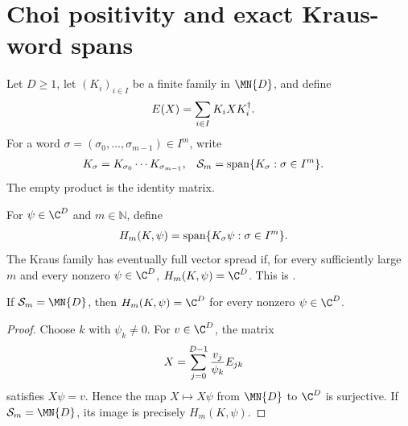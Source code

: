 \section{Choi positivity and exact Kraus-word spans}
\label{sec:kraus_iterate_choi}

Let $D\geq1$, let $(K_i)_{i\in I}$ be a finite family in $\MN{D}$, and define
\begin{align}
    E(X)&=\sum_{i\in I}K_iXK_i^\dagger.
    \notag
\end{align}
For a word $\sigma=(\sigma_0,\ldots,\sigma_{m-1})\in I^m$, write
\begin{align}
    K_\sigma&=K_{\sigma_0}\cdots K_{\sigma_{m-1}},
    &
    \mathcal S_m&=\operatorname{span}\{K_\sigma:\sigma\in I^m\}.
    \notag
\end{align}
The empty product is the identity matrix.

\begin{definition}
    \label{def:kraus_eventually_full_vector_spread}
    \leanok
    For $\psi\in\C^D$ and $m\in\mathbb N$, define
    \begin{align}
        H_m(K,\psi)
        &=\operatorname{span}\{K_\sigma\psi:\sigma\in I^m\}.
        \notag
    \end{align}
    The Kraus family has eventually full vector spread if, for every
    sufficiently large $m$ and every nonzero $\psi\in\C^D$,
    $H_m(K,\psi)=\C^D$. This is
    \cite[Theorem~6.8(2)]{Wolf2012Quantum}.
\end{definition}

\begin{theorem}
    \label{thm:kraus_vector_spread_of_word_span}
    \leanok
    If $\mathcal S_m=\MN{D}$, then
    $H_m(K,\psi)=\C^D$ for every nonzero $\psi\in\C^D$.
\end{theorem}

\begin{proof}
    \leanok
    Choose $k$ with $\psi_k\neq0$. For $v\in\C^D$, the matrix
    \begin{align}
        X&=\sum_{j=0}^{D-1}\frac{v_j}{\psi_k}E_{jk}
        \notag
    \end{align}
    satisfies $X\psi=v$. Hence the map $X\mapsto X\psi$ from $\MN{D}$ to
    $\C^D$ is surjective. If $\mathcal S_m=\MN{D}$, its image is precisely
    $H_m(K,\psi)$.
\end{proof}

